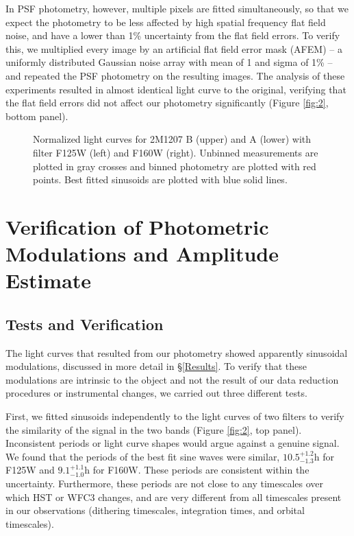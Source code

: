 \documentclass[apj]{emulateapj}
\begin{document}
In PSF photometry, however, multiple pixels are fitted simultaneously,
so that we expect the photometry to be less affected by high spatial frequency flat field
noise, and have a lower than 1\% uncertainty from the flat field
errors. To verify this, we multiplied every image by an artificial flat
field error mask (AFEM) -- a uniformly distributed Gaussian noise array with
mean of 1 and sigma of 1\% -- and repeated the PSF photometry on the
resulting images.  The analysis of these experiments resulted in almost
identical light curve to the original, verifying that the flat field
errors did not affect our photometry significantly (Figure
\ref{fig:2}, bottom panel).


\label{Results}

  \begin{figure}
  \centering
  \caption{Normalized light curves for 2M1207 B (upper) and A (lower)
    with filter F125W (left) and F160W (right). Unbinned
  measurements are plotted in gray crosses and binned photometry are
  plotted with red points. Best fitted sinusoids are plotted
  with blue solid lines.}
  \label{fig:3}
\end{figure}

\section{Verification of Photometric Modulations and Amplitude
  Estimate}



\subsection{Tests and Verification}

The light curves that resulted from our photometry showed apparently
sinusoidal modulations, discussed in more detail in
\S\ref{Results}. To verify that these modulations are intrinsic to
the object and not the result of our data reduction procedures or 
instrumental changes, we carried out three different tests.

First, we fitted sinusoids independently to the light curves of two
filters to verify the similarity of the signal in the two bands
(Figure \ref{fig:2}, top panel). Inconsistent periods or light curve
shapes would argue against a genuine signal.  We found that the periods
of the best fit sine waves were similar, $10.5^{+1.2}_{-1.3}$h for
F125W and $9.1^{+1.1}_{-1.0}$h for F160W. These periods are consistent
within the uncertainty. Furthermore, these periods are not close to
any timescales over which HST or WFC3 changes, and are
very different from all timescales present in our observations
(dithering timescales, integration times, and orbital timescales).
\end{document}

